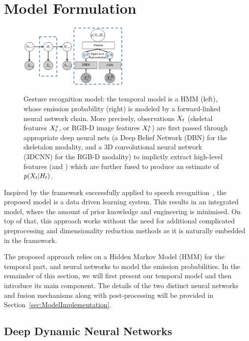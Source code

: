

\section{Model Formulation}
\label{sec:approach}

\begin{figure}[t]
  \centering
  \includegraphics[width=0.48\textwidth]{images/GraphicalModel_new2}\\
  \caption{Gesture recognition model: the temporal model is a HMM (left), whose emission probability 
\emissionprob{} (right) is modeled by a forward-linked neural network chain. 
More precisely, observations $X_t$ (skeletal features $X^{s}_t$, or RGB-D image features $X^{s}_t$) 
are first passed through appropriate deep neural nets (a Deep Belief Network (DBN) for the skeletalon modality, and 
 a 3D convolutional neural network (3DCNN) for the RGB-D modality) to implictly extract high-level features (\highSK and \highRGBD)
which are further fused to produce an estimate of $p(X_t|H_t)$.
} 
\label{fig:GM}
\end{figure}

Inspired by the framework successfully applied to speech recognition~\cite{mohamed2012acoustic}, the proposed model is a data driven learning system. This results in an integrated model, where the amount of prior knowledge and engineering is minimised. On top of that, this approach works without the need for additional complicated preprocessing and dimensionality reduction methods as it is naturally embedded in the framework.

The proposed approach relies on a Hidden Markov Model (HMM) for the temporal part, 
and neural networks to model the emission probabilities.
 In the remainder of this section, we will first present our temporal model and then introduce its main component. 
The details of the two distinct neural networks and fusion mechanisms along with post-processing will be provided 
in Section~\ref{sec:ModelImplementation}.


\subsection{Deep Dynamic Neural Networks}
\label{sec:DDNN}

